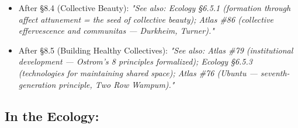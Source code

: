 \begin{itemize}[nosep,leftmargin=*]
  \item After §8.4 (Collective Beauty): \textit{"See also: Ecology §6.5.1 (formation through affect attunement = the seed of collective beauty); Atlas \#86 (collective effervescence and communitas — Durkheim, Turner)."}
  \item After §8.5 (Building Healthy Collectives): \textit{"See also: Atlas \#79 (institutional development — Ostrom's 8 principles formalized); Ecology §6.5.3 (technologies for maintaining shared space); Atlas \#76 (Ubuntu — seventh-generation principle, Two Row Wampum)."}
\end{itemize}


\subsection*{In the Ecology:}


